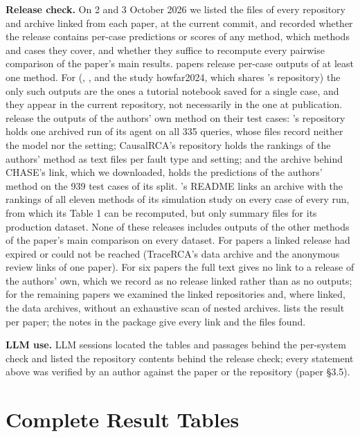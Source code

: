 \documentclass[10pt]{article}
\begin{document}
\textbf{Release check.} On 2 and 3 October 2026 we listed the files of every repository and archive linked from each paper, at the current commit, and recorded whether the release contains per-case predictions or scores of any method, which methods and cases they cover, and whether they suffice to recompute every pairwise comparison of the paper's main results. \SurveyRelAny papers release per-case outputs of at least one method. For \SurveyRelDemo (\baro, \rcaeval, and the study howfar2024, which shares \rcaeval's repository) the only such outputs are the ones a tutorial notebook saved for a single case, and they appear in the current repository, not necessarily in the one at publication. \SurveyRelOwn release the outputs of the authors' own method on their test cases: \openrca's repository holds one archived run of its agent on all 335 queries, whose files record neither the model nor the setting; CausalRCA's repository holds the rankings of the authors' method as text files per fault type and setting; and the archive behind CHASE's link, which we downloaded, holds the predictions of the authors' method on the 939 test cases of its split. \circa's README links an archive with the rankings of all eleven methods of its simulation study on every case of every run, from which its Table 1 can be recomputed, but only summary files for its production dataset. None of these releases includes outputs of the other methods of the paper's main comparison on every dataset. For \SurveyRelUndet papers a linked release had expired or could not be reached (TraceRCA's data archive and the anonymous review links of one paper). For six papers the full text gives no link to a release of the authors' own, which we record as no release linked rather than as no outputs; for the remaining papers we examined the linked repositories and, where linked, the data archives, without an exhaustive scan of nested archives.  lists the result per paper; the notes in the package give every link and the files found.

\textbf{LLM use.} LLM sessions located the tables and passages behind the per-system check and listed the repository contents behind the release check; every statement above was verified by an author against the paper or the repository (paper \S3.5).



\section{Complete Result Tables}
\label{sec:full}


\end{document}
